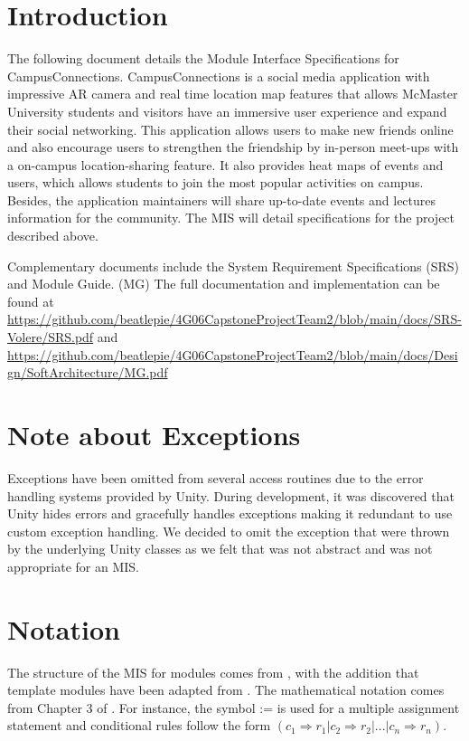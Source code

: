 \documentclass[12pt, titlepage]{article}
\begin{document}
\newpage

\tableofcontents

\newpage


\section{Introduction}

The following document details the Module Interface Specifications for CampusConnections. CampusConnections is a social media application with impressive AR camera and real time location map features that allows McMaster University students and visitors have an immersive user experience and expand their social networking. This application allows users to make new friends online and also encourage users to strengthen the friendship by in-person meet-ups with a on-campus location-sharing feature. It also provides heat maps of events and users, which allows students to join the most popular activities on campus. Besides, the application maintainers will share up-to-date events and lectures information for the community. The MIS will detail specifications for the project described above.

Complementary documents include the System Requirement Specifications (SRS)
and Module Guide. (MG)  The full documentation and implementation can be
found at \url{https://github.com/beatlepie/4G06CapstoneProjectTeam2/blob/main/docs/SRS-Volere/SRS.pdf} and \url{https://github.com/beatlepie/4G06CapstoneProjectTeam2/blob/main/docs/Design/SoftArchitecture/MG.pdf}

\section{Note about Exceptions}
Exceptions have been omitted from several access routines due to the error handling systems provided by Unity.
During development, it was discovered that Unity hides errors and gracefully handles exceptions making it redundant to use custom exception handling.
We decided to omit the exception that were thrown by the underlying Unity classes as we felt that was not abstract and was not appropriate for an MIS. 

\section{Notation}
The structure of the MIS for modules comes from \citet{HoffmanAndStrooper1995},
with the addition that template modules have been adapted from
\cite{GhezziEtAl2003}.  The mathematical notation comes from Chapter 3 of
\citet{HoffmanAndStrooper1995}.  For instance, the symbol := is used for a
multiple assignment statement and conditional rules follow the form $(c_1
\Rightarrow r_1 | c_2 \Rightarrow r_2 | ... | c_n \Rightarrow r_n )$.
\end{document}
